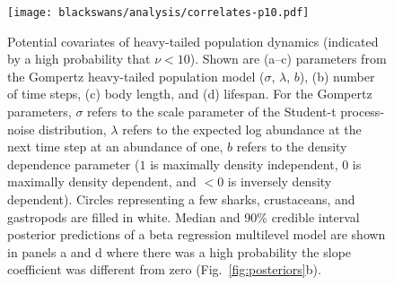 \begin{figure}[htbp]
\begin{center}
\texttt{[image: blackswans/analysis/correlates-p10.pdf]}

\caption[Potential covariates of heavy-tailed population dynamics (indicated
  by a high probability that $\nu < 10$).]{Potential covariates of heavy-tailed population dynamics (indicated
  by a high probability that $\nu < 10$). Shown are (a--c) parameters from the
  Gompertz heavy-tailed population model ($\sigma$, $\lambda$, $b$), (b)
  number of time steps, (c) body length, and (d) lifespan. For the Gompertz
  parameters, $\sigma$ refers to the scale parameter of the Student-t
  process-noise distribution, $\lambda$ refers to the expected log abundance
  at the next time step at an abundance of one, $b$ refers to the density
  dependence parameter ($1$ is maximally density independent, $0$ is maximally
  density dependent, and $<0$ is inversely density dependent). Circles
  representing a few sharks, crustaceans, and gastropods are filled in white.
  Median and 90\% credible interval posterior predictions of a beta regression
  multilevel model are shown in panels a and d where there was a high
  probability the slope coefficient was different from zero
  (Fig.~\ref{fig:posteriors}b).}

\label{fig:correlates}
\end{center}
\end{figure}

\clearpage

